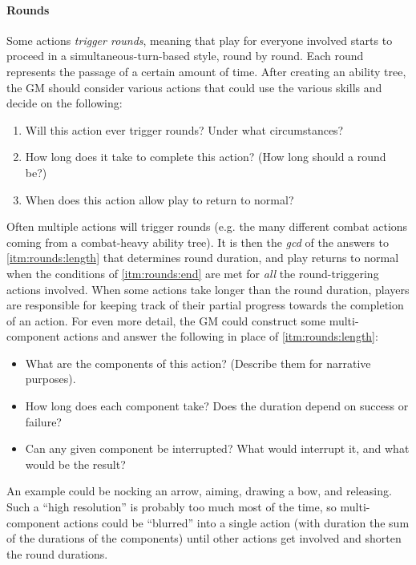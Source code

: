 \documentclass[12pt]{article}
\begin{document}
\paragraph{Rounds}
Some actions \emph{trigger rounds},
meaning that play for everyone involved starts to proceed in a simultaneous-turn-based style,
round by round.
Each round represents the passage of a certain amount of time.
After creating an ability tree, the GM should consider various actions
that could use the various skills and decide on the following:
\vspace{-1em}
\begin{enumerate}
\item\label{itm:rounds:trigger}
Will this action ever trigger rounds? Under what circumstances?
\item\label{itm:rounds:length}
How long does it take to complete this action? (How long should a round be?)
\item\label{itm:rounds:end}
When does this action allow play to return to normal?
\end{enumerate}
Often multiple actions will trigger rounds 
(e.g. the many different combat actions coming from a combat-heavy ability tree).
It is then the \emph{gcd} of the answers to \ref{itm:rounds:length} that determines round duration,
and play returns to normal when the conditions of \ref{itm:rounds:end} are met for \emph{all} the round-triggering actions involved.
When some actions take longer than the round duration, players are responsible for keeping track of their partial progress towards
the completion of an action.
For even more detail, the GM could construct some multi-component actions and answer the following in place of \ref{itm:rounds:length}:
\vspace{-1em}
\begin{itemize}
\item What are the components of this action? (Describe them for narrative purposes).
\item How long does each component take? Does the duration depend on success or failure?
\item Can any given component be interrupted? What would interrupt it, and what would be the result?
\end{itemize}
An example could be nocking an arrow, aiming, drawing a bow, and releasing.
Such a ``high resolution'' is probably too much most of the time, so multi-component actions could be ``blurred'' into a single
action (with duration the sum of the durations of the components) until other actions get involved and shorten the round durations.
\end{document}
